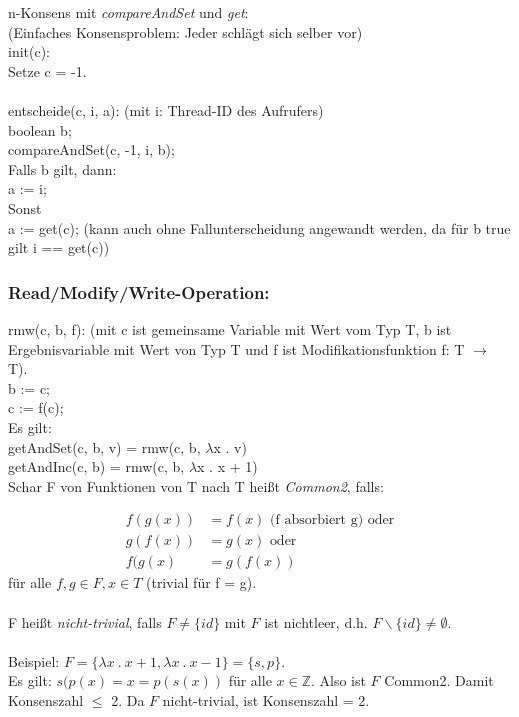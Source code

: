 n-Konsens mit \emph{compareAndSet} und \emph{get}:\\
(Einfaches Konsensproblem: Jeder schlägt sich selber vor)\\
init(c):\\
	Setze c = -1.\\
\\
entscheide(c, i, a): (mit i: Thread-ID des Aufrufers)\\
	boolean b;\\
	compareAndSet(c, -1, i, b);\\
	Falls b gilt, dann:\\
		a := i;\\
	Sonst\\
		a := get(c); (kann auch ohne Fallunterscheidung angewandt werden, da für b true gilt i == get(c))\\

\subsubsection*{Read/Modify/Write-Operation:}
rmw(c, b, f): (mit c ist gemeinsame Variable mit Wert vom Typ T, b ist Ergebnisvariable mit Wert von Typ T und f ist Modifikationsfunktion f: T $\rightarrow$ T).\\
	b := c;\\
	c := f(c);\\
	
Es gilt: \\
	getAndSet(c, b, v) = rmw(c, b, $\lambda$x . v)\\
	getAndInc(c, b) = rmw(c, b, $\lambda$x . x + 1)\\

Schar F von Funktionen von T nach T heißt \emph{Common2}, falls:

\begin{align}
f(g(x)) & = f(x) \text{ (f absorbiert g) oder}\\
g(f(x)) & = g(x) \text{ oder}\\
f(g(x) & = g(f(x))	
\end{align}
für alle $f, g \in F, x \in T$ (trivial für f = g).\\
\\
F heißt \emph{nicht-trivial}, falls $ F \neq \{id\} $ mit $ F $ ist nichtleer, d.h. $ F \backslash \{id\} \neq \emptyset $.\\
\\
Beispiel: $ F = \{\lambda x\ .\ x + 1, \lambda x\ .\ x - 1\} = \{s, p\} $.\\
Es gilt: $ s(p(x) = x = p(s(x)) $ für alle $ x \in \mathbb{Z} $. Also ist $ F $ Common2. Damit Konsenszahl $\leq$ 2. Da $ F $ nicht-trivial, ist Konsenszahl = 2. 